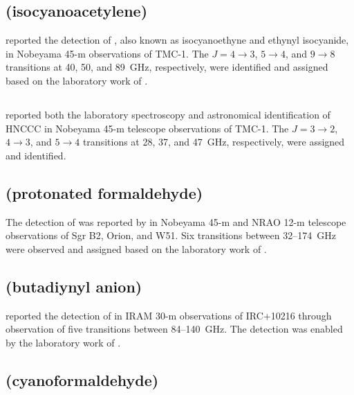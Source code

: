 \documentclass[twocolumn]{aastex631}
\begin{document}
	\subsection{ (isocyanoacetylene)}
	\label{HCCNC}
	
	\citet{Kawaguchi:1992bl} reported the detection of , also known as isocyanoethyne and  ethynyl isocyanide, in Nobeyama 45-m observations of TMC-1.  The $J = 4\rightarrow3$, $5\rightarrow4$, and $9\rightarrow8$ transitions at 40, 50, and 89~GHz, respectively, were identified and assigned based on the laboratory work of \citet{Krueger:2010gi}.
	
	\subsection{}
	\label{HNCCC}
	
	\citet{Kawaguchi:1992pw} reported both the laboratory spectroscopy and astronomical identification of HNCCC in Nobeyama 45-m telescope observations of TMC-1.  The $J = 3\rightarrow2$, $4\rightarrow3$, and $5\rightarrow4$ transitions at 28, 37, and 47~GHz, respectively, were assigned and identified.
	
	\subsection{ (protonated formaldehyde)}
	\label{H2COH+}
	
	The detection of  was reported by \citet{Ohishi:1996hc} in Nobeyama 45-m and NRAO 12-m telescope observations of Sgr B2, Orion, and W51.  Six transitions between 32--174~GHz were observed and assigned based on the laboratory work of \citet{Chomiak:1994bd}.
	
	\subsection{ (butadiynyl anion)}
	\label{C4H-}
	
	\citet{Cernicharo:2007id} reported the detection of  in IRAM 30-m observations of IRC+10216 through observation of five transitions between 84--140~GHz.  The detection was enabled by the laboratory work of \citet{Gupta:2007vc}.
	
	\subsection{ (cyanoformaldehyde)}
	\label{CNCHO}
	
\end{document}
